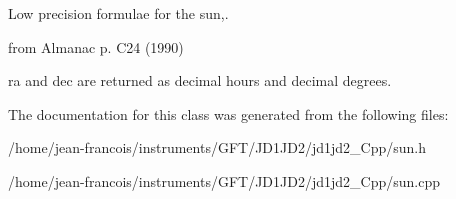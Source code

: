 Low precision formulae for the sun,. 

from Almanac p. C24 (1990) \par
 ra and dec are returned as decimal hours and decimal degrees. 

The documentation for this class was generated from the following files\-:\begin{DoxyCompactItemize}
\item 
/home/jean-\/francois/instruments/\-G\-F\-T/\-J\-D1\-J\-D2/jd1jd2\-\_\-\-Cpp/sun.\-h\item 
/home/jean-\/francois/instruments/\-G\-F\-T/\-J\-D1\-J\-D2/jd1jd2\-\_\-\-Cpp/sun.\-cpp\end{DoxyCompactItemize}
